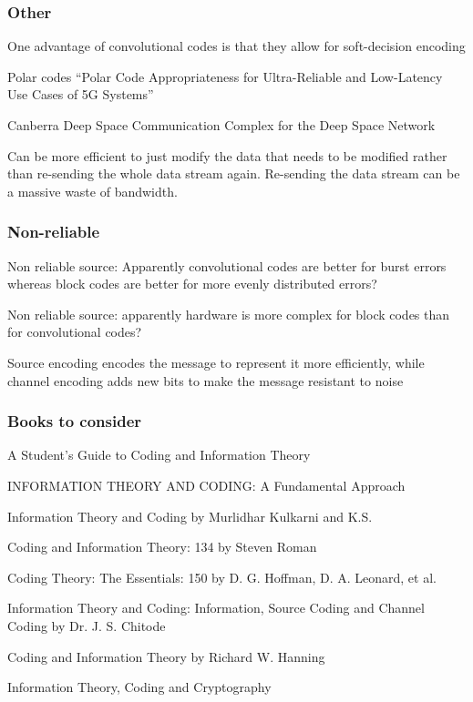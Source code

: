 \documentclass{article}
\begin{document}
\subsubsection{Other}

One advantage of convolutional codes is that they allow for soft-decision encoding 

Polar codes “Polar Code Appropriateness for Ultra-Reliable and Low-Latency Use Cases of 5G Systems”

Canberra Deep Space Communication Complex for the Deep Space Network

Can be more efficient to just modify the data that needs to be modified rather than re-sending the whole data stream again. Re-sending the data stream can be a massive waste of bandwidth.

\subsubsection{Non-reliable}

Non reliable source: Apparently convolutional codes are better for burst errors whereas block codes are better for more evenly distributed errors?

Non reliable source: apparently hardware is more complex for block codes than for convolutional codes?

Source encoding encodes the message to represent it more efficiently, while channel encoding adds new bits to make the message resistant to noise

\subsubsection{Books to consider}

A Student's Guide to Coding and Information Theory

INFORMATION THEORY AND CODING: A Fundamental Approach

Information Theory and Coding
by Murlidhar Kulkarni and K.S. 

Coding and Information Theory: 134
by Steven Roman

Coding Theory: The Essentials: 150
by D. G. Hoffman, D. A. Leonard, et al.

Information Theory and Coding: Information, Source Coding and Channel Coding
by Dr. J. S. Chitode

Coding and Information Theory
by Richard W. Hanning

Information Theory, Coding and Cryptography
\end{document}
